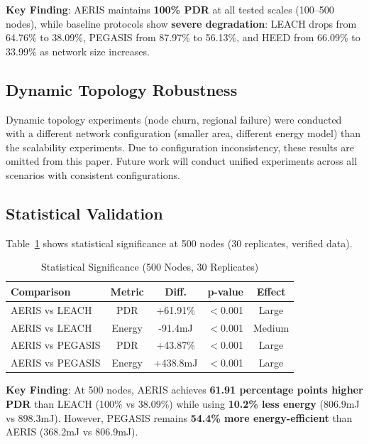 \documentclass[twocolumn]{article}
\begin{document}
\textbf{Key Finding}: AERIS maintains \textbf{100\% PDR} at all tested scales
(100--500 nodes), while baseline protocols show \textbf{severe degradation}:
LEACH drops from 64.76\% to 38.09\%, PEGASIS from 87.97\% to 56.13\%,
and HEED from 66.09\% to 33.99\% as network size increases.

\subsection{Dynamic Topology Robustness}

Dynamic topology experiments (node churn, regional failure) were conducted
with a different network configuration (smaller area, different energy model)
than the scalability experiments. Due to configuration inconsistency, these
results are omitted from this paper. Future work will conduct unified
experiments across all scenarios with consistent configurations.


\subsection{Statistical Validation}

Table~\ref{tab:significance} shows statistical significance at 500 nodes
(30 replicates, verified data).

\begin{table}[htbp]
\centering
\caption{Statistical Significance (500 Nodes, 30 Replicates)}
\label{tab:significance}
\begin{tabular}{@{}lcccc@{}}
\toprule
Comparison & Metric & Diff. & p-value & Effect \\
\midrule
AERIS vs LEACH & PDR & +61.91\% & $<$0.001 & Large \\
AERIS vs LEACH & Energy & -91.4mJ & $<$0.001 & Medium \\
AERIS vs PEGASIS & PDR & +43.87\% & $<$0.001 & Large \\
AERIS vs PEGASIS & Energy & +438.8mJ & $<$0.001 & Large \\
\bottomrule
\end{tabular}
\end{table}

\textbf{Key Finding}: At 500 nodes, AERIS achieves \textbf{61.91 percentage
points higher PDR} than LEACH (100\% vs 38.09\%) while using \textbf{10.2\%
less energy} (806.9mJ vs 898.3mJ). However, PEGASIS remains \textbf{54.4\%
more energy-efficient} than AERIS (368.2mJ vs 806.9mJ).
\end{document}
